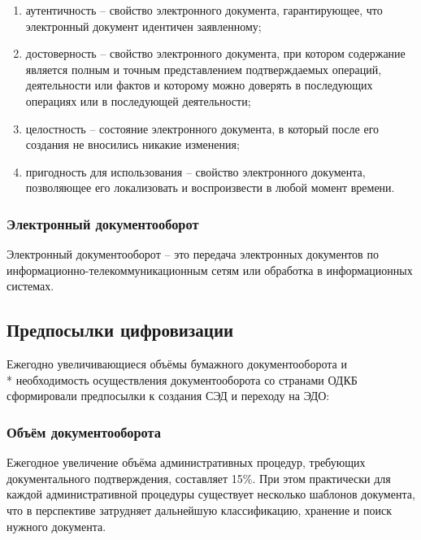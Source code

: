 \begin{enumerate}
	\item аутентичность -- свойство электронного документа, гарантирующее, что электронный документ идентичен заявленному;
	
	\item достоверность -- свойство электронного документа, при котором содержание является полным и точным представлением подтверждаемых операций, деятельности или фактов и которому можно доверять в последующих операциях или в последующей деятельности;
	
	\item целостность -- состояние электронного документа, в который после его создания не вносились никакие изменения;

	\item пригодность для использования -- свойство электронного документа, позволяющее его локализовать и воспроизвести в любой момент времени.
\end{enumerate}

\subsubsection{Электронный документооборот}

Электронный документооборот -- это передача электронных документов по информационно-телекоммуникационным сетям или обработка в информационных системах\cite{fns}.

\subsection{Предпосылки цифровизации}

Ежегодно увеличивающиеся объёмы бумажного документооборота и \\* необходимость осуществления документооборота со странами ОДКБ сформировали предпосылки к создания СЭД и переходу на ЭДО:

\subsubsection{Объём документооборота}
Ежегодное увеличение объёма административных процедур, требующих документального подтверждения, составляет 15\%\cite{roseu}. При этом практически для каждой административной процедуры существует несколько шаблонов документа, что в перспективе затрудняет дальнейшую классификацию, хранение и поиск нужного документа.

